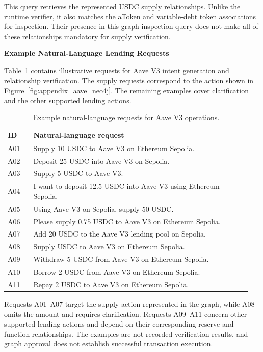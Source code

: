 This query retrieves the represented USDC supply
relationships. Unlike the runtime verifier, it also
matches the aToken and variable-debt token associations
for inspection. Their presence in this graph-inspection
query does not make all of these relationships mandatory
for supply verification.


\medskip
\noindent\textbf{Example Natural-Language Lending Requests}

\medskip

Table~\ref{tab:aave_user_queries} contains illustrative
requests for Aave V3 intent generation and relationship
verification. The supply requests correspond to the
action shown in Figure~\ref{fig:appendix_aave_neo4j}.
The remaining examples cover clarification and the
other supported lending actions.

\begin{table}[htbp]
\centering
\small
\renewcommand{\arraystretch}{1.15}
\caption{Example natural-language requests for Aave V3 operations.}
\label{tab:aave_user_queries}
\begin{tabular}{@{}p{0.10\linewidth}p{0.85\linewidth}@{}}
\hline
\textbf{ID} & \textbf{Natural-language request} \\
\hline
A01 & Supply 10 USDC to Aave V3 on Ethereum Sepolia. \\
A02 & Deposit 25 USDC into Aave V3 on Sepolia. \\
A03 & Supply 5 USDC to Aave V3. \\
A04 & I want to deposit 12.5 USDC into Aave V3 using Ethereum Sepolia. \\
A05 & Using Aave V3 on Sepolia, supply 50 USDC. \\
A06 & Please supply 0.75 USDC to Aave V3 on Ethereum Sepolia. \\
A07 & Add 20 USDC to the Aave V3 lending pool on Sepolia. \\
A08 & Supply USDC to Aave V3 on Ethereum Sepolia. \\
A09 & Withdraw 5 USDC from Aave V3 on Ethereum Sepolia. \\
A10 & Borrow 2 USDC from Aave V3 on Ethereum Sepolia. \\
A11 & Repay 2 USDC to Aave V3 on Ethereum Sepolia. \\
\hline
\end{tabular}
\end{table}

Requests A01--A07 target the supply action represented
in the graph, while A08 omits the amount and requires
clarification. Requests A09--A11 concern other supported
lending actions and depend on their corresponding
reserve and function relationships. The examples are
not recorded verification results, and graph approval
does not establish successful transaction execution.


